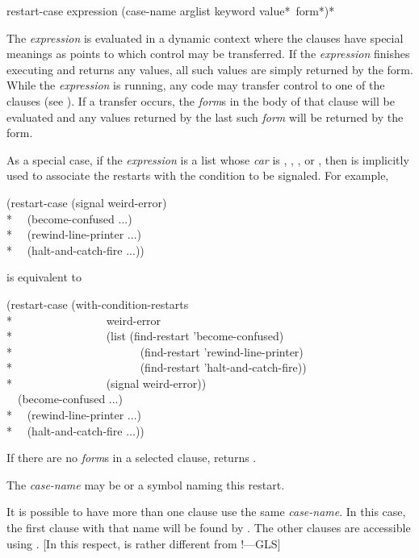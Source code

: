 \begin{defmac}
restart-case expression {(case-name arglist
                         {keyword value}*
                         {\,form}*)}*

  The {\it expression} is evaluated in a dynamic context where the clauses have 
  special meanings as points to which control may be transferred. If the {\it expression}
  finishes executing and returns any values, all such values are simply
  returned by the  form. While the {\it expression} is running, any code may
  transfer control to one of the clauses (see ). If a transfer
  occurs, the {\it form\/}s in the body of that clause will be evaluated and any values
  returned by the last such {\it form} will be returned by the  form.

As a special case,
if the {\it expression} is a list whose {\it car} is , ,
     , or , then  is implicitly
     used to associate the restarts with the condition to be signaled.
For example,
\begin{lisp}
(restart-case (signal weird-error) \\*
~~(become-confused ...) \\*
~~(rewind-line-printer ...) \\*
~~(halt-and-catch-fire ...))
\end{lisp}
     is equivalent to
\begin{lisp}
(restart-case (with-condition-restarts \\*
~~~~~~~~~~~~~~~~weird-error  \\*
~~~~~~~~~~~~~~~~(list (find-restart 'become-confused)  \\*
~~~~~~~~~~~~~~~~~~~~~~(find-restart 'rewind-line-printer) \\*
~~~~~~~~~~~~~~~~~~~~~~(find-restart 'halt-and-catch-fire)) \\*
~~~~~~~~~~~~~~~~(signal weird-error)) \\
~~(become-confused ...) \\*
~~(rewind-line-printer ...) \\*
~~(halt-and-catch-fire ...))
\end{lisp}

  If there are no {\it form\/}s in a selected clause,  returns .

  The {\it case-name} may be  or a symbol naming this restart.

  It is possible to have more than one clause use the same {\it case-name}.
  In this case, the first clause with that name will be found by
  . The other clauses are accessible using .
  [In this respect,  is rather different from !---GLS]


\end{defmac}
